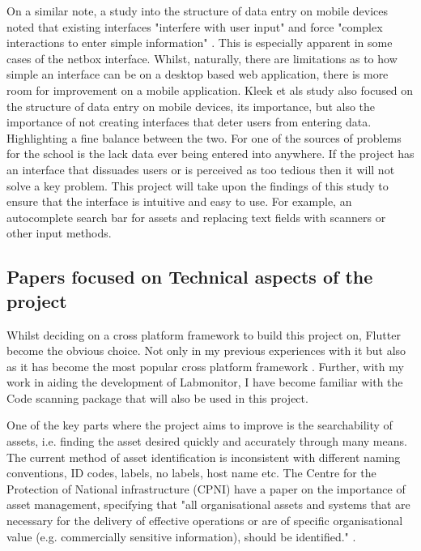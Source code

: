 \documentclass [11pt,a4paper]{article}
\begin{document}
On a similar note, a study into the structure of data entry on mobile devices noted that existing interfaces "interfere with user input" and force "complex interactions to enter simple information" \cite{van2007gui}. This is especially apparent in some cases of the netbox interface. Whilst, naturally, there are limitations as to how simple an interface can be on a desktop based web application, there is more room for improvement on a mobile application. Kleek et als \cite{van2007gui} study also focused on the structure of data entry on mobile devices, its importance, but also the importance of not creating interfaces that deter users from entering data. Highlighting a fine balance between the two. For one of the sources of problems for the school is the lack data ever being entered into anywhere. If the project has an interface that dissuades users or is perceived as too tedious then it will not solve a key problem. This project will take upon the findings of this study to ensure that the interface is intuitive and easy to use. For example, an autocomplete search bar for assets and replacing text fields with scanners or other input methods. 

\subsection{Papers focused on Technical aspects of the project}
\label{sec:technical}

Whilst deciding on a cross platform framework to build this project on, Flutter become the obvious choice. Not only in my previous experiences with it but also as it has become the most popular cross platform framework \cite{JetBrainsFlutter}. Further, with my work in aiding the development of Labmonitor\cite{labmonitor}, I have become familiar with the Code scanning package that will also be used in this project\cite{barcodeScannerPlugin}.

One of the key parts where the project aims to improve is the searchability of assets, i.e. finding the asset desired quickly and accurately through many means. The current method of asset identification is inconsistent with different naming conventions, ID codes, labels, no labels, host name etc. The Centre for the Protection of National infrastructure (CPNI) have a paper on the importance of asset management, specifying that "all organisational assets and systems that are necessary for the delivery of effective operations or are of specific organisational value (e.g. commercially sensitive information), should be identified." \cite{cpni}.
\end{document}
